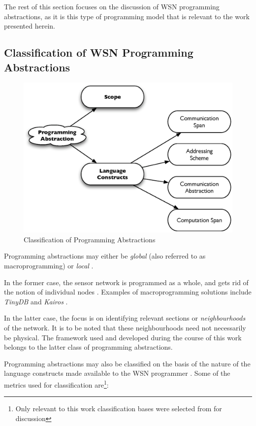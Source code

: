 The rest of this section focuses on the discussion of WSN programming
abstractions, as it is this type of programming model that is relevant to the
work presented herein.

\subsection{Classification of WSN Programming Abstractions}

\begin{figure}
\centering
\includegraphics[scale=0.65]{img/ProgAbstr_Classification.eps}
\caption{Classification of Programming Abstractions} 
\label{Fig:ProgrAbstrClassification}
\end{figure} 

Programming abstractions may either be \emph{global} (also referred to 
as macroprogramming) or \emph{local} \cite{hadim_middleware:2006}. 

In the former case, the sensor network is programmed as a whole, and gets rid of
the notion of individual nodes \cite{mottola_middleware:2008}. Examples of
macroprogramming solutions include \emph{TinyDB} \cite{madden_TinyDB:2005} and
\emph{Kairos} \cite{gummadi_Kairos:2005}. 

In the latter case, the focus is on identifying relevant sections or
\emph{neighbourhoods} of the network. It is to be noted that these neighbourhoods
need not necessarily be physical. The framework used and developed during the
course of this work belongs to the latter class of programming abstractions.

Programming abstractions may also be classified on the basis of the
nature of the language constructs made available to the WSN programmer
\cite{mottola_middleware:2008}. Some of the metrics used for classification
are\footnote{Only relevant to this work classification bases
were selected from \cite{mottola_middleware:2008} for discussion}:

